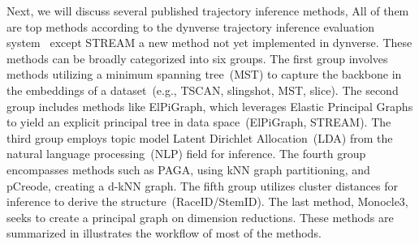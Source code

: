 Next, we will discuss several published trajectory inference methods, All of them are top methods according to the dynverse trajectory inference evaluation system~\citep{saelens2019comparison} except STREAM a new method not yet implemented in dynverse. These methods can be broadly categorized into six groups. The first group involves methods utilizing a minimum spanning tree~(MST) to capture the backbone in the embeddings of a dataset~(e.g., TSCAN, slingshot, MST, slice). The second group includes methods like ElPiGraph, which leverages Elastic Principal Graphs to yield an explicit principal tree in data space~(ElPiGraph, STREAM). The third group employs topic model Latent Dirichlet Allocation~(LDA) from the natural language processing~(NLP) field for inference. The fourth group encompasses methods such as PAGA, using kNN graph partitioning, and pCreode, creating a d-kNN graph. The fifth group utilizes cluster distances for inference to derive the structure~(RaceID/StemID). The last method, Monocle3, seeks to create a principal graph on dimension reductions. These methods are summarized in  illustrates the workflow of most of the methods.
